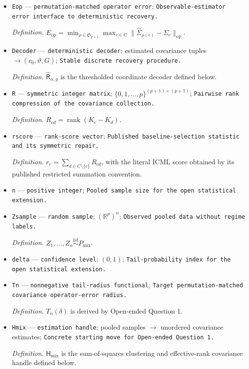 \documentclass{article}
\begin{document}
\begin{itemize}
  \par\smallskip\noindent\emph{Definition.} \(\widehat K_c=\widehat\Sigma_c^{-1}\) whenever the inverse exists.
  \item \texttt{Eop} --- \texttt{permutation-\allowbreak{}matched operator error}; \texttt{Observable-\allowbreak{}estimator error interface to deterministic recovery.}
  \par\smallskip\noindent\emph{Definition.} \(E_{\mathrm{op}}=\min_{\rho\in\mathfrak S_{p+1}}\max_{c\in C}\|\widehat\Sigma_{\rho(c)}-\Sigma_c\|_{\mathrm{op}}\).
  \item \texttt{Decoder} --- \texttt{deterministic decoder}; estimated covariance tuples \(\to(c_0,\vartheta,G)\); \texttt{Stable discrete recovery procedure.}
  \par\smallskip\noindent\emph{Definition.} \(\widehat{\mathsf R}_{\alpha,g}\) is the thresholded coordinate decoder defined below.
  \item \texttt{R} --- \texttt{symmetric integer matrix}; \(\{0,1,\ldots,p\}^{(p+1)\times(p+1)}\); \texttt{Pairwise rank compression of the covariance collection.}
  \par\smallskip\noindent\emph{Definition.} \(R_{cd}=\operatorname{rank}(K_c-K_d)\).
  \item \texttt{rscore} --- \texttt{rank-\allowbreak{}score vector}; \texttt{Published baseline-\allowbreak{}selection statistic and its symmetric repair.}
  \par\smallskip\noindent\emph{Definition.} \(r_c=\sum_{d\in C\setminus\{c\}}R_{cd}\), with the literal ICML score obtained by its published restricted summation convention.
  \item \texttt{n} --- \texttt{positive integer}; \texttt{Pooled sample size for the open statistical extension.}
  \item \texttt{Zsample} --- \texttt{random sample}; \((\mathbb R^p)^n\); \texttt{Observed pooled data without regime labels.}
  \par\smallskip\noindent\emph{Definition.} \(Z_1,\ldots,Z_n\stackrel{\mathrm{iid}}{\sim}P_{\mathrm{mix}}\).
  \item \texttt{delta} --- \texttt{confidence level}; \((0,1)\); \texttt{Tail-\allowbreak{}probability index for the open statistical extension.}
  \item \texttt{Tn} --- \texttt{nonnegative tail-\allowbreak{}radius functional}; \texttt{Target permutation-\allowbreak{}matched covariance operator-\allowbreak{}error radius.}
  \par\smallskip\noindent\emph{Definition.} \(T_n(\delta)\) is derived by Open-ended Question 1.
  \item \texttt{Hmix} --- \texttt{estimation handle}; pooled samples \(\to\) unordered covariance estimates; \texttt{Concrete starting move for Open-\allowbreak{}ended Question 1.}
  \par\smallskip\noindent\emph{Definition.} \(\mathsf H_{\mathrm{mix}}\) is the sum-of-squares clustering and effective-rank covariance handle defined below.
\end{itemize}
\end{document}
